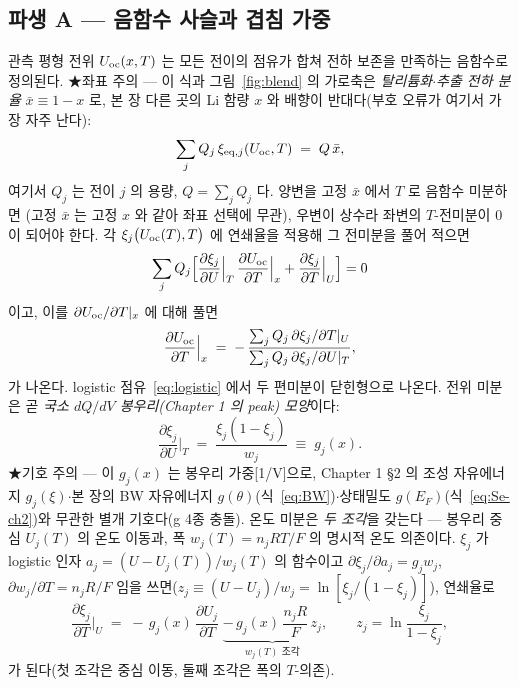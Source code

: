 \subsection{파생 A --- 음함수 사슬과 겹침 가중}\label{ssec:overlap}
관측 평형 전위 $U_{\mathrm{oc}}(x,T)$ 는 모든 전이의 점유가 합쳐 전하 보존을 만족하는 음함수로 정의된다. ★좌표 주의
--- 이 식과 그림~\ref{fig:blend} 의 가로축은 \emph{탈리튬화$\cdot$추출 전하 분율} $\bar x\equiv1-x$ 로, 본 장
다른 곳의 Li 함량 $x$ 와 배향이 반대다(부호 오류가 여기서 가장 자주 난다):
\begin{equation}
\sum_j Q_j\,\xi_{\mathrm{eq},j}(U_{\mathrm{oc}},T) \;=\; Q\,\bar x,
\label{eq:implicit}
\end{equation}
여기서 $Q_j$ 는 전이 $j$ 의 용량, $Q=\sum_j Q_j$ 다. 양변을 고정 $\bar x$ 에서 $T$ 로 음함수 미분하면
(고정 $\bar x$ 는 고정 $x$ 와 같아 좌표 선택에 무관), 우변이 상수라 좌변의 $T$-전미분이 $0$ 이 되어야
한다. 각 $\xi_j\bigl(U_{\mathrm{oc}}(T),T\bigr)$ 에 연쇄율을 적용해 그 전미분을 풀어 적으면
\[
\sum_j Q_j\Big[\frac{\partial\xi_j}{\partial U}\Big|_T\,\frac{\partial U_{\mathrm{oc}}}{\partial T}\Big|_x
+\frac{\partial\xi_j}{\partial T}\Big|_U\Big]=0
\]
이고, 이를 $\partial U_{\mathrm{oc}}/\partial T|_x$ 에 대해 풀면
\begin{equation}
\frac{\partial U_{\mathrm{oc}}}{\partial T}\Big|_x
\;=\; -\,\frac{\sum_j Q_j\,\partial\xi_j/\partial T|_U}{\sum_j Q_j\,\partial\xi_j/\partial U|_T},
\label{eq:implicit_diff}
\end{equation}
가 나온다. logistic 점유~\eqref{eq:logistic} 에서 두 편미분이 닫힌형으로 나온다. 전위 미분은 곧 \emph{국소
$dQ/dV$ 봉우리(Chapter 1 의 peak) 모양}이다:
\begin{equation}
\frac{\partial\xi_j}{\partial U}\Big|_T \;=\; \frac{\xi_j(1-\xi_j)}{w_j} \;\equiv\; g_j(x).
\label{eq:gj}
\end{equation}
★기호 주의 --- 이 $g_j(x)$ 는 봉우리 가중[1/V]으로, Chapter 1 §2 의 조성 자유에너지 $g_j(\xi)$$\cdot$본 장의
BW 자유에너지 $g(\theta)$(식~\eqref{eq:BW})$\cdot$상태밀도 $g(E_F)$(식~\eqref{eq:Se-ch2})와 무관한 별개
기호다(g 4종 충돌). 온도 미분은 \emph{두 조각}을 갖는다 --- 봉우리 중심 $U_j(T)$ 의 온도 이동과,
폭 $w_j(T)=n_jRT/F$ 의 명시적 온도 의존이다. $\xi_j$ 가 logistic 인자 $a_j=(U-U_j(T))/w_j(T)$ 의 함수이고
$\partial\xi_j/\partial a_j=g_j w_j$, $\partial w_j/\partial T=n_jR/F$ 임을 쓰면($z_j\equiv(U-U_j)/w_j=\ln[\xi_j/
(1-\xi_j)]$), 연쇄율로
\begin{equation}
\frac{\partial\xi_j}{\partial T}\Big|_U
\;=\; -\,g_j(x)\,\frac{\partial U_j}{\partial T}
\;\underbrace{-\,g_j(x)\,\frac{n_jR}{F}\,z_j}_{w_j(T)\text{ 조각}},
\qquad z_j=\ln\frac{\xi_j}{1-\xi_j},
\label{eq:dxidT}
\end{equation}
가 된다(첫 조각은 중심 이동, 둘째 조각은 폭의 $T$-의존).

